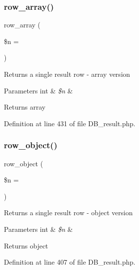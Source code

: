 \mbox{\label{class_c_i___d_b__result_a8dbff471ffdaf617d49189f8636e4f81}} 
\subsubsection{\texorpdfstring{row\_array()}{row\_array()}}
{\footnotesize\ttfamily row\+\_\+array (\begin{DoxyParamCaption}\item[{}]{\$n = {} }\end{DoxyParamCaption})}

Returns a single result row -\/ array version


\begin{DoxyParams}[1]{Parameters}
int & {\em \$n} & \\
\hline
\end{DoxyParams}
\begin{DoxyReturn}{Returns}
array 
\end{DoxyReturn}


Definition at line 431 of file D\+B\+\_\+result.\+php.

\mbox{\label{class_c_i___d_b__result_a0bd3520c57f5cb192bdfaeed1f597c0a}} 
\subsubsection{\texorpdfstring{row\_object()}{row\_object()}}
{\footnotesize\ttfamily row\+\_\+object (\begin{DoxyParamCaption}\item[{}]{\$n = {} }\end{DoxyParamCaption})}

Returns a single result row -\/ object version


\begin{DoxyParams}[1]{Parameters}
int & {\em \$n} & \\
\hline
\end{DoxyParams}
\begin{DoxyReturn}{Returns}
object 
\end{DoxyReturn}


Definition at line 407 of file D\+B\+\_\+result.\+php.

